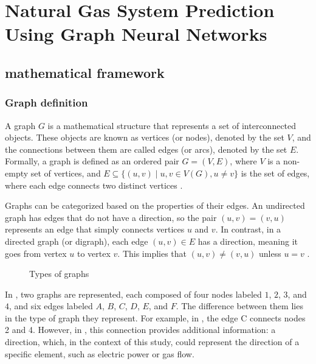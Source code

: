 \chapter{Natural Gas System Prediction Using Graph Neural Networks} \label{cap:lienal-censnet}

\section{mathematical framework}

\subsection{Graph definition}


A graph $G$ is a mathematical structure that represents a set of interconnected objects. These objects are known as vertices (or nodes), denoted by the set $V$, and the connections between them are called edges (or arcs), denoted by the set $E$. Formally, a graph is defined as an ordered pair $G = (V, E)$, where $V$ is a non-empty set of vertices, and $E \subseteq \{(u, v) \mid u, v \in V(G), u \neq v\}$ is the set of edges, where each edge connects two distinct vertices \cite{Trudeau_2015}.

Graphs can be categorized based on the properties of their edges. An undirected graph has edges that do not have a direction, so the pair $(u, v) = (v, u)$ represents an edge that simply connects vertices $u$ and $v$. In contrast, in a directed graph (or digraph), each edge $(u, v) \in E$ has a direction, meaning it goes from vertex $u$ to vertex $v$. This implies that $(u, v) \neq (v, u)$ unless $u = v$ \cite{Bender_Williamson_2010}.

\begin{figure}
    \centering
        \setlength{}        
        \setlength{} 
    \caption{Types of graphs}\label{fig:graph_definition}
\end{figure}

In , two graphs are represented, each composed of four nodes labeled $1$, $2$, $3$, and $4$, and six edges labeled $A$, $B$, $C$, $D$, $E$, and $F$. The difference between them lies in the type of graph they represent. For example, in , the edge C connects nodes 2 and 4. However, in , this connection provides additional information: a direction, which, in the context of this study, could represent the direction of a specific element, such as electric power or gas flow.



